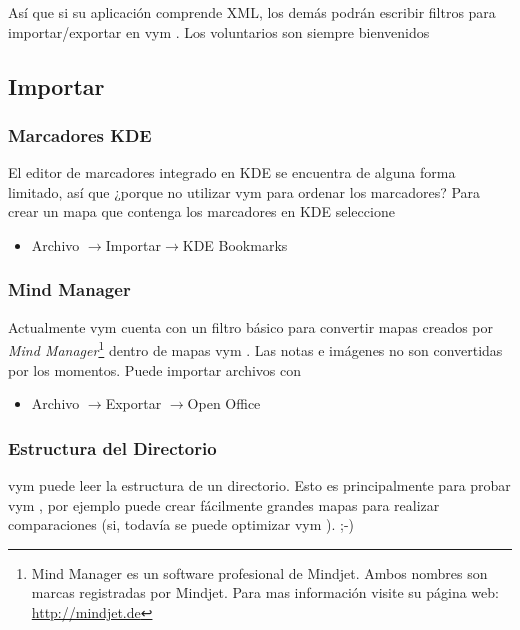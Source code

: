 \documentclass{article}
\newcommand{\vym}{{\sc vym }}
\newcommand{\ra}{$\longrightarrow$}
\begin{document}
As\'i que si su aplicaci\'on comprende XML, los dem\'as podr\'an escribir filtros para importar/exportar en \vym. Los voluntarios son siempre bienvenidos


\subsection{Importar} \label{import}

\subsubsection*{Marcadores KDE}
El editor de marcadores integrado en KDE se encuentra de alguna forma limitado, as\'i que ¿porque no utilizar \vym para ordenar los marcadores? Para crear un mapa que contenga los marcadores en KDE seleccione
\begin{itemize}
	\item Archivo \ra Importar\ra KDE Bookmarks
\end{itemize}

\subsubsection*{Mind Manager}
Actualmente \vym cuenta con un filtro b\'asico para convertir mapas creados por {\em Mind Manager}\footnote{
Mind Manager es un software profesional de Mindjet. Ambos nombres son marcas registradas por Mindjet. Para mas informaci\'on visite su p\'agina web: \href{http://mindjet.de}{http://mindjet.de}} dentro de mapas \vym. Las notas e im\'agenes no son convertidas por los momentos. Puede importar archivos con

\begin{itemize}
	\item Archivo \ra Exportar \ra Open Office
\end{itemize}


\subsubsection*{Estructura del Directorio}
\vym puede leer la estructura de un directorio. Esto es principalmente para probar \vym, por ejemplo puede crear f\'acilmente grandes mapas para realizar comparaciones (si, todav\'ia se puede optimizar \vym). ;-)
\end{document}
